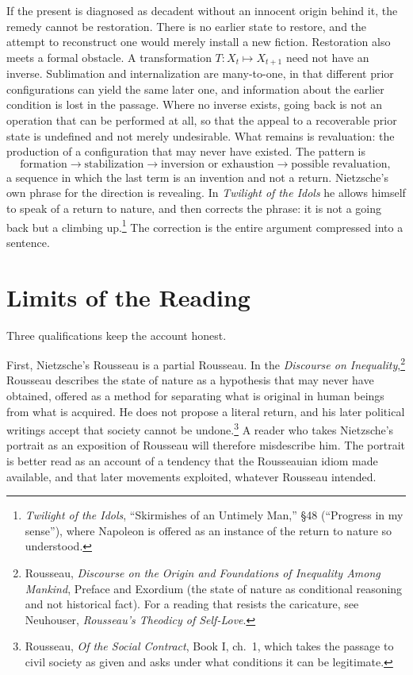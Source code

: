 \documentclass[11pt]{article}
\theoremstyle{definition}
\begin{document}
If the present is diagnosed as decadent without an innocent origin behind it, the remedy cannot be restoration. There is no earlier state to restore, and the attempt to reconstruct one would merely install a new fiction. Restoration also meets a formal obstacle. A transformation $T:X_t\mapsto X_{t+1}$ need not have an inverse. Sublimation and internalization are many-to-one, in that different prior configurations can yield the same later one, and information about the earlier condition is lost in the passage. Where no inverse exists, going back is not an operation that can be performed at all, so that the appeal to a recoverable prior state is undefined and not merely undesirable. What remains is revaluation: the production of a configuration that may never have existed. The pattern is
\[
\text{formation} \rightarrow \text{stabilization} \rightarrow \text{inversion or exhaustion} \rightarrow \text{possible revaluation},
\]
a sequence in which the last term is an invention and not a return. Nietzsche's own phrase for the direction is revealing. In \emph{Twilight of the Idols} he allows himself to speak of a return to nature, and then corrects the phrase: it is not a going back but a climbing up.\footnote{\emph{Twilight of the Idols}, ``Skirmishes of an Untimely Man,'' \S48 (``Progress in my sense''), where Napoleon is offered as an instance of the return to nature so understood.} The correction is the entire argument compressed into a sentence.

\section{Limits of the Reading}

Three qualifications keep the account honest.

First, Nietzsche's Rousseau is a partial Rousseau. In the \emph{Discourse on Inequality},\footnote{Rousseau, \emph{Discourse on the Origin and Foundations of Inequality Among Mankind}, Preface and Exordium (the state of nature as conditional reasoning and not historical fact). For a reading that resists the caricature, see Neuhouser, \emph{Rousseau's Theodicy of Self-Love}.} Rousseau describes the state of nature as a hypothesis that may never have obtained, offered as a method for separating what is original in human beings from what is acquired. He does not propose a literal return, and his later political writings accept that society cannot be undone.\footnote{Rousseau, \emph{Of the Social Contract}, Book I, ch.~1, which takes the passage to civil society as given and asks under what conditions it can be legitimate.} A reader who takes Nietzsche's portrait as an exposition of Rousseau will therefore misdescribe him. The portrait is better read as an account of a tendency that the Rousseauian idiom made available, and that later movements exploited, whatever Rousseau intended.
\end{document}

